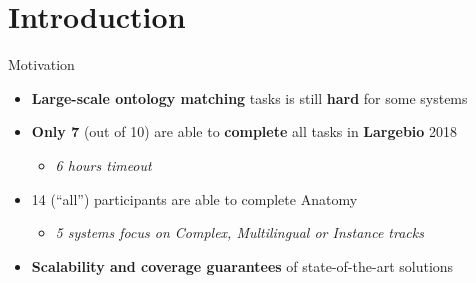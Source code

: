 \documentclass[t]{beamer}
\title{}
\subtitle{We Divide, You Conquer: From Large-scale Ontology Alignment to Manageable Subtasks}
\date{October 8, 2018}
\author{\textbf{Ernesto Jim\'enez-Ruiz}, Asan Agibetov, Matthias Samwald, Valerie Cross}
\begin{document}
\begin{frame}
	\titlepage
\end{frame}


\section{Introduction}



\begin{frame}{Motivation}

  		\begin{itemize}    
  			\item \textbf{Large-scale ontology matching} tasks is still \textbf{hard} for some systems
  			\item \textbf{Only 7} (out of 10) are able to \textbf{complete} all tasks in \textbf{Largebio} 2018 
  			\begin{itemize}
  			    \item \textit{6 hours timeout}
  			\end{itemize}
  			\item 14 (``all'') participants are able to complete Anatomy
  			\begin{itemize}
  			    \item \textit{5 systems focus on Complex, Multilingual or Instance tracks}
  			\end{itemize}
  			\item \textbf{Scalability and coverage guarantees} of state-of-the-art solutions
  		\end{itemize}
  	
\end{frame}
\end{document}
